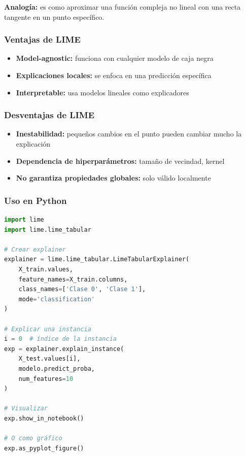 \documentclass[11pt,a4paper]{article}
\begin{document}
\textbf{Analogía:} es como aproximar una función compleja no lineal con una recta tangente en un punto específico.

\subsubsection{Ventajas de LIME}

\begin{itemize}
\item \textbf{Model-agnostic:} funciona con cualquier modelo de caja negra
\item \textbf{Explicaciones locales:} se enfoca en una predicción específica
\item \textbf{Interpretable:} usa modelos lineales como explicadores
\end{itemize}

\subsubsection{Desventajas de LIME}

\begin{itemize}
\item \textbf{Inestabilidad:} pequeños cambios en el punto pueden cambiar mucho la explicación
\item \textbf{Dependencia de hiperparámetros:} tamaño de vecindad, kernel
\item \textbf{No garantiza propiedades globales:} solo válido localmente
\end{itemize}

\subsubsection{Uso en Python}

\begin{lstlisting}[language=Python]
import lime
import lime.lime_tabular

# Crear explainer
explainer = lime.lime_tabular.LimeTabularExplainer(
    X_train.values,
    feature_names=X_train.columns,
    class_names=['Clase 0', 'Clase 1'],
    mode='classification'
)

# Explicar una instancia
i = 0  # índice de la instancia
exp = explainer.explain_instance(
    X_test.values[i], 
    modelo.predict_proba,
    num_features=10
)

# Visualizar
exp.show_in_notebook()

# O como gráfico
exp.as_pyplot_figure()
\end{lstlisting}
\end{document}
